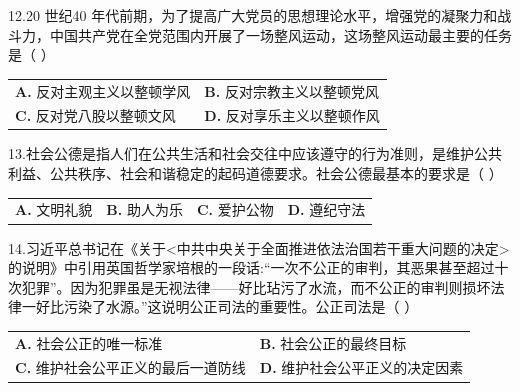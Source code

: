 \documentclass[UTF8,11pt]{ctexart}
\begin{document}
12.20 世纪40 年代前期，为了提高广大党员的思想理论水平，增强党的凝聚力和战斗力，中国共产党在全党范围内开展了一场整风运动，这场整风运动最主要的任务是（  ）


\begin{center}\begin{tabular}{>{\raggedright\arraybackslash}p{\dimexpr(\linewidth-4\tabcolsep)/2\relax}>{\raggedright\arraybackslash}p{\dimexpr(\linewidth-4\tabcolsep)/2\relax}}
\textbf{A.} 反对主观主义以整顿学风 & \textbf{B.} 反对宗教主义以整顿党风\\[.35em]
\textbf{C.} 反对党八股以整顿文风 & \textbf{D.} 反对享乐主义以整顿作风\\[.35em]\end{tabular}\end{center}

13.社会公德是指人们在公共生活和社会交往中应该遵守的行为准则，是维护公共利益、公共秩序、社会和谐稳定的起码道德要求。社会公德最基本的要求是（  ）


\begin{center}\begin{tabular}{>{\raggedright\arraybackslash}p{\dimexpr(\linewidth-8\tabcolsep)/4\relax}>{\raggedright\arraybackslash}p{\dimexpr(\linewidth-8\tabcolsep)/4\relax}>{\raggedright\arraybackslash}p{\dimexpr(\linewidth-8\tabcolsep)/4\relax}>{\raggedright\arraybackslash}p{\dimexpr(\linewidth-8\tabcolsep)/4\relax}}
\textbf{A.} 文明礼貌 & \textbf{B.} 助人为乐 & \textbf{C.} 爱护公物 & \textbf{D.} 遵纪守法\\[.35em]\end{tabular}\end{center}

14.习近平总书记在《关于<中共中央关于全面推进依法治国若干重大问题的决定>的说明》中引用英国哲学家培根的一段话:“一次不公正的审判，其恶果甚至超过十次犯罪”。因为犯罪虽是无视法律——好比玷污了水流，而不公正的审判则损坏法律一好比污染了水源。”这说明公正司法的重要性。公正司法是（  ）


\begin{center}\begin{tabular}{>{\raggedright\arraybackslash}p{\dimexpr(\linewidth-4\tabcolsep)/2\relax}>{\raggedright\arraybackslash}p{\dimexpr(\linewidth-4\tabcolsep)/2\relax}}
\textbf{A.} 社会公正的唯一标准 & \textbf{B.} 社会公正的最终目标\\[.35em]
\textbf{C.} 维护社会公平正义的最后一道防线 & \textbf{D.} 维护社会公平正义的决定因素\\[.35em]\end{tabular}\end{center}
\end{document}
